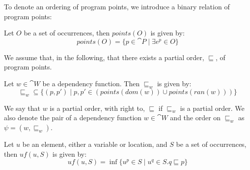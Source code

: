 \documentclass[../../master.tex]{subfiles}
\begin{document}
To denote an ordering of program points, we introduce a binary relation of program points:

\begin{definition}\label{def:RelPoint}
	Let $O$ be a set of occurrences, then $points(O)$ is given by:
	$$points(O)=\{p\in\cat{P}\mid\exists e^p\in O\}$$
\end{definition}
We assume that, in the following, that there exists a partial order, $\sqsubseteq$, of program points.

\begin{definition}[]\label{def:RelPoint}
	Let $w\in\cat{W}$ be a dependency function.
	Then $\sqsubseteq_w$ is given by:
	$$\sqsubseteq_w\subseteq\{(p,p')\mid p,p'\in(points(dom(w))\cup points(ran(w)))\}$$
\end{definition}
We say that $w$ is a partial order, with right to, $\sqsubseteq$ if $\sqsubseteq_w$ is a partial order.
We also denote the pair of a dependency function $w\in\cat{W}$ and the order on $\sqsubseteq_w$ as $\psi=(w,\sqsubseteq_w)$.

\iffalse
\begin{definition}[Relation of program points]\label{def:RelPoint}
	Let \cat{P} be a set of program points, we say that:
	$$\sqsubseteq\subseteq\cat{P}\times\cat{P}$$
	is a binary relation over program points.
\end{definition}
We denote $(p',p'')\in\sqsubseteq$ as $p'\sqsubseteq p''$ and we also denote that $\sqsubseteq_w$ is a relation of program points over a dependency function $w\in\cat{W}$, i.e., the relation $\sqsubseteq_w$ only contains program points that exists either in the domain or co-domain of $w$. 

We also define $\psi\in\Psi$ that that contains a dependency function $w$ and an ordering of program points over $w$, as $(w,\sqsubseteq_w)$.

\begin{definition}[Partial order]
	Let $\psi\in\Psi$ be a pair of a dependency function $w$ and a relation of program points $\sqsubseteq_w$.
	We say that $\psi$ is partial order if $\sqsubseteq_w$ is a partial order.
\end{definition}
\fi

\begin{definition}\label{def:GBind}
	Let $u$ be an element, either a variable or location, and $S$ be a set of occurrences, then $uf(u,S)$ is given by:
	$$uf(u,S)=\inf\{u^p\in S\mid u^q\in S.q\sqsubseteq p\}$$
\end{definition}
\end{document}
